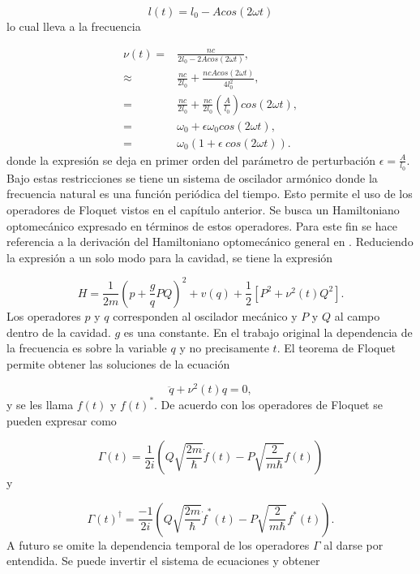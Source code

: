 \documentclass[10pt,a4paper]{report}
\begin{document}
\begin{equation}
l(t) = l_0 - A cos(2\omega t)
\end{equation} lo cual lleva a la frecuencia 

\begin{align}
\nu(t) =& \frac{nc}{2l_0-2Acos(2\omega t)}, \\
\approx& \frac{nc}{2l_0} + \frac{nc Acos(2\omega t)}{4l_0^2}, \\
=& \frac{nc}{2l_0} + \frac{nc}{2l_0}(\frac{A}{l_0})cos(2\omega t), \\
=& \omega_0 + \epsilon\omega_0 cos(2\omega t), \\
=& \omega_0(1+\epsilon\ cos(2\omega t)).
\end{align} donde la expresión se deja en primer orden del parámetro de perturbación $\epsilon = \frac{A}{l_0}$. Bajo estas restricciones se tiene un sistema de oscilador armónico donde la frecuencia natural es una función periódica del tiempo. Esto permite el uso de los operadores de Floquet vistos en el capítulo anterior. Se busca un Hamiltoniano optomecánico expresado en términos de estos operadores. Para este fin se hace referencia a la derivación del Hamiltoniano optomecánico general en \cite{LawOH}. Reduciendo la expresión a un solo modo para la cavidad, se tiene la expresión

\begin{equation}
H = \frac{1}{2m}(p + \frac{g}{q} PQ)^2 + v(q) + \frac{1}{2}[P^2+\nu^2 (t)Q^2].
\end{equation} Los operadores $p$ y $q$ corresponden al oscilador mecánico y $P$ y $Q$ al campo dentro de la cavidad. $g$ es una constante. En el trabajo original la dependencia de la frecuencia es sobre la variable $q$ y no precisamente $t$. El teorema de Floquet permite obtener las soluciones de la ecuación

\begin{equation}
\ddot{q} + \nu^2(t)q=0,
\end{equation} y se les llama $f(t)$ y $f(t)^*$. De acuerdo con \cite{HanngiFM} los operadores de Floquet se pueden expresar como

\begin{equation}
\Gamma(t) = \frac{1}{2i}(Q\sqrt{\frac{2m}{\hbar}}\dot{f}(t)-P\sqrt{\frac{2}{m\hbar}}f(t))
\end{equation} y

\begin{equation}
\Gamma(t)^\dagger = \frac{-1}{2i}(Q\sqrt{\frac{2m}{\hbar}}\dot{f}^*(t)-P\sqrt{\frac{2}{m\hbar}}f^*(t)).
\end{equation} A futuro se omite la dependencia temporal de los operadores $\Gamma$ al darse por entendida. Se puede invertir el sistema de ecuaciones y obtener
\end{document}
